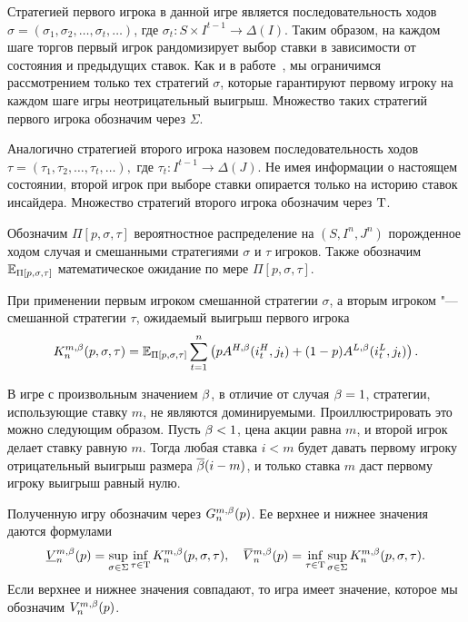 {Стратегией первого игрока в данной игре является последовательность ходов 
$\sigma = (\sigma_1, \sigma_2, \ldots, \sigma_t, \ldots)$, где 
$\sigma_t: S \times I^{t-1} \rightarrow \Delta(I)$.
Таким образом, на каждом шаге торгов первый игрок рандомизирует выбор ставки в зависимости от состояния и предыдущих ставок.
Как и в работе~\cite{domansky07}, мы ограничимся рассмотрением только тех стратегий $\sigma$, которые гарантируют первому игроку на каждом шаге игры неотрицательный выигрыш.
Множество таких стратегий первого игрока обозначим через $\Sigma$.

Аналогично стратегией второго игрока назовем последовательность ходов 
$\tau = (\tau_1, \tau_2, \ldots, \tau_t, \ldots),$ где 
$\tau_t: I^{t-1} \rightarrow \Delta(J)$.
Не имея информации о настоящем состоянии, второй игрок при выборе ставки опирается только на историю ставок инсайдера.
Множество стратегий второго игрока обозначим через $\mathrm{T}$.

Обозначим $\Pi[p, \sigma, \tau]$ вероятностное распределение на $(S, I^n, J^n)$ порожденное ходом случая и смешанными стратегиями $\sigma$ и $\tau$ игроков.
Также обозначим $\operatorname{\mathbb{E}}_{\Pi[p,\sigma,\tau]}$ математическое ожидание по мере $\Pi[p, \sigma, \tau]$.

При применении первым игроком смешанной стратегии $\sigma$, а вторым игроком "--- смешанной стратегии $\tau$, ожидаемый выигрыш первого игрока
\begin{equation}
  \label{ch1:eq:firstPlayerPayoff}
  K^{m,\beta}_n(p, \sigma, \tau) = \operatorname{\mathbb{E}}_{\Pi[p,\sigma,\tau]} \sum_{t=1}^n
  \left(
    pA^{H,\beta}(i_t^H, j_t) + (1 - p)A^{L,\beta}(i_t^L, j_t)
  \right).
\end{equation}

\begin{remark}
  В игре с произвольным значением $\beta$, в отличие от случая $\beta = 1$, стратегии, использующие ставку $m$, не являются доминируемыми.
  Проиллюстрировать это можно следующим образом.
  Пусть $\beta < 1$, цена акции равна $m$, и второй игрок делает ставку равную $m$.
  Тогда любая ставка $i < m$ будет давать первому игроку отрицательный выигрыш размера ${\overline{\beta}} (i - m)$, и только ставка $m$ даст первому игроку выигрыш равный нулю. 
\end{remark}

Полученную игру обозначим через $G^{m,\beta}_n(p)$. Ее верхнее и нижнее значения даются формулами
\begin{equation*}
  \underline{V}^{m,\Co}_n(p) = \sup_{\sigma \in \Sigma} \inf_{\tau \in \Tau}
  K^{m,\Co}_n(p, \sigma, \tau), \quad
  \overbar{V}^{m,\Co}_n(p) = \inf_{\tau \in \Tau} \sup_{\sigma \in \Sigma}
  K^{m,\Co}_n(p, \sigma, \tau).
\end{equation*}
Если верхнее и нижнее значения совпадают, то игра имеет значение, которое мы обозначим $V^{m,\beta}_n(p)$.

}
